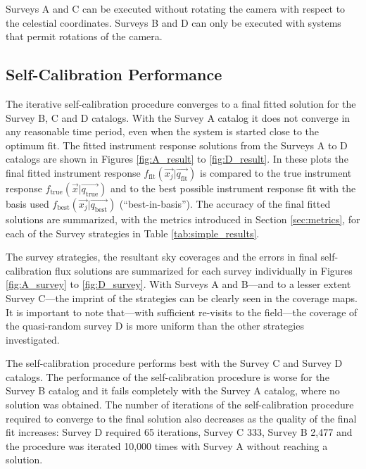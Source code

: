 \documentclass[preprint,pdftex]{aastex}
\newcommand{\true}{\text{true}}
\newcommand{\fit}{\text{fit}}
\newcommand{\basis}{\text{best}}
\begin{document}
Surveys A and C can be executed without rotating the camera with respect to the celestial coordinates. Surveys B and D can only be executed with systems that permit rotations of the camera.

\subsection{Self-Calibration Performance}
The iterative self-calibration procedure converges to a final fitted solution for the Survey B, C and D catalogs. With the Survey A catalog it does not converge in any reasonable time period, even when the system is started close to the optimum fit. The fitted instrument response solutions from the Surveys A to D catalogs are shown in Figures \ref{fig:A_result} to \ref{fig:D_result}. In these plots the final fitted instrument response $f_\fit(\vec{x_j} | \vec{q_\fit})$ is compared to the true instrument response $f_\true(\vec{x} | \vec{q_\true})$ and to the best possible instrument response fit with the basis used $f_\basis(\vec{x_j} | \vec{q_\basis})$ (``best-in-basis''). The accuracy of the final fitted solutions are summarized, with the metrics introduced in Section \ref{sec:metrics}, for each of the Survey strategies in Table \ref{tab:simple_results}. 

The survey strategies, the resultant sky coverages and the errors in final self-calibration flux solutions are summarized for each survey individually in Figures \ref{fig:A_survey} to \ref{fig:D_survey}. With Surveys A and B---and to a lesser extent Survey C---the imprint of the strategies can be clearly seen in the coverage maps. It is important to note that---with sufficient re-visits to the field---the coverage of the quasi-random survey D is more uniform than the other strategies investigated.

The self-calibration procedure performs best with the Survey C and Survey D catalogs. The performance of the self-calibration procedure is worse for the Survey B catalog and it fails completely with the Survey A catalog, where no solution was obtained. The number of iterations of the self-calibration procedure required to converge to the final solution also decreases as the quality of the final fit increases: Survey D required 65 iterations, Survey C 333, Survey B 2,477 and the procedure was iterated 10,000 times with Survey A without reaching a solution.
\end{document}

